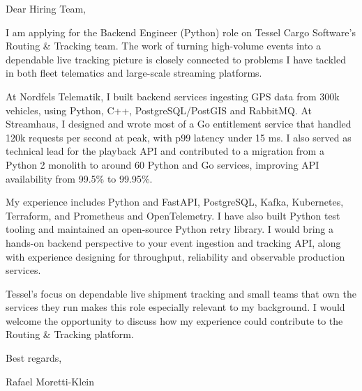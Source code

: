 \documentclass[11pt,a4paper]{article}
\begin{document}
Dear Hiring Team,

I am applying for the Backend Engineer (Python) role on Tessel Cargo Software’s Routing \& Tracking team. The work of turning high-volume events into a dependable live tracking picture is closely connected to problems I have tackled in both fleet telematics and large-scale streaming platforms.

At Nordfels Telematik, I built backend services ingesting GPS data from 300k vehicles, using Python, C++, PostgreSQL/PostGIS and RabbitMQ. At Streamhaus, I designed and wrote most of a Go entitlement service that handled 120k requests per second at peak, with p99 latency under 15 ms. I also served as technical lead for the playback API and contributed to a migration from a Python 2 monolith to around 60 Python and Go services, improving API availability from 99.5\% to 99.95\%.

My experience includes Python and FastAPI, PostgreSQL, Kafka, Kubernetes, Terraform, and Prometheus and OpenTelemetry. I have also built Python test tooling and maintained an open-source Python retry library. I would bring a hands-on backend perspective to your event ingestion and tracking API, along with experience designing for throughput, reliability and observable production services.

Tessel’s focus on dependable live shipment tracking and small teams that own the services they run makes this role especially relevant to my background. I would welcome the opportunity to discuss how my experience could contribute to the Routing \& Tracking platform.

Best regards,

Rafael Moretti-Klein
\end{document}
